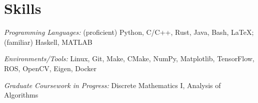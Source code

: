 \documentclass[\ifdefined\cv10pt\else10pt\fi,letterpaper]{moderncv}
\newcommand{\cvonly}[1]{\ifdefined\cv#1\fi\ignorespaces}
\renewcommand{\cvitem}[2]{\item {#1}\hfill\textit{#2}}
\let\oldsection\section
\renewcommand{\section}[1]{\vspace*{-1.3ex}\oldsection{#1}\vspace*{-0.5ex}}
\begin{document}

\section{Skills}
\textit{Programming Languages:} (proficient) Python, C/C++, Rust, Java, Bash, \LaTeX; (familiar) Haskell, MATLAB \par
\textit{Environments/Tools:} Linux, Git, Make, CMake, NumPy, Matplotlib, TensorFlow, ROS, OpenCV, Eigen, Docker \par
\textit{Graduate Coursework in Progress:} Discrete Mathematics I, Analysis of Algorithms
\end{document}
